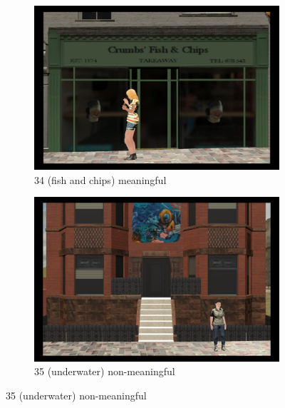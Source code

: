 \begin{figure}[!htb]
	\begin{subfigure}[b]{0.48\linewidth}
		\includegraphics[width=\linewidth]{figures/starting_locations_appx/34_S(fish and chips)_A.PNG}
		\caption{34 (fish and chips) meaningful}
		\label{fig:34_S(fish and chips)_A}
	\end{subfigure}
	\begin{subfigure}[b]{0.48\linewidth}
		\includegraphics[width=\linewidth]{figures/starting_locations_appx/35_R(underwater)_A.PNG}
		\caption{35 (underwater) non-meaningful}
		\label{fig:35_R(underwater)_A}
	\end{subfigure}
	

\end{figure}
